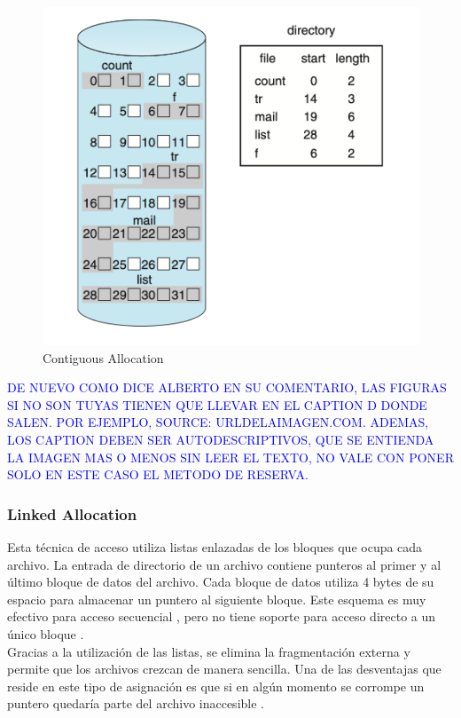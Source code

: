 \begin{figure}[H]
    \centering
    \includegraphics[scale=0.65]{doc/assets/images/Allocation Methods/continuous.png}
    \caption{Contiguous Allocation}
    \label{fig:my_label}
\end{figure}

\textcolor{blue}{DE NUEVO COMO DICE ALBERTO EN SU COMENTARIO, LAS FIGURAS SI NO SON TUYAS TIENEN QUE LLEVAR EN EL CAPTION D DONDE SALEN. POR EJEMPLO, SOURCE: URLDELAIMAGEN.COM. ADEMAS, LOS CAPTION DEBEN SER AUTODESCRIPTIVOS, QUE SE ENTIENDA LA IMAGEN MAS O MENOS SIN LEER EL TEXTO, NO VALE CON PONER SOLO EN ESTE CASO EL METODO DE RESERVA.}


\subsubsection{Linked Allocation}
Esta técnica de acceso utiliza listas enlazadas de los bloques que ocupa cada archivo. La entrada de directorio de un archivo contiene punteros al primer y al último bloque de datos del archivo. Cada bloque de datos utiliza 4 bytes de su espacio para almacenar un puntero al siguiente bloque. Este esquema es muy efectivo para acceso secuencial , pero no tiene soporte para acceso directo a un único bloque \cite{silberchatz}.\\

Gracias a la utilización de las listas, se elimina la fragmentación externa y permite que los archivos crezcan de manera sencilla. Una de las desventajas que reside en este tipo de asignación es que si en algún momento se corrompe un puntero quedaría parte del archivo inaccesible \cite{silberchatz}.

